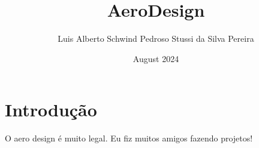 \documentclass[oneside,12pt,a4paper]{report}
\title{AeroDesign}
\author{Luis Alberto Schwind Pedroso Stussi da Silva Pereira}
\date{August 2024}
\begin{document}
\pagestyle{plain}
\maketitle

\tableofcontents




\clearpage








\section{Introdução}

O aero design é muito legal. Eu fiz muitos amigos fazendo projetos! \cite{çengel2015mecânica}












% 
\end{document}
